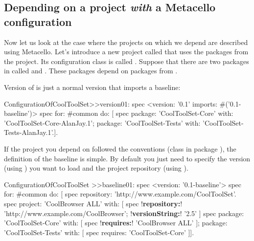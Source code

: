\documentclass[a4paper,10pt,twoside]{book}
\begin{document}
\subsection{Depending on a project \emph{with} a Metacello configuration}
Now let us look at the case where the projects on which we depend are described using Metacello.
Let's introduce a new project called  that uses the packages from the  project.  Its configuration class is called .   Suppose that there are two packages in  called  and . These packages depend on packages from . 

Version  of  is just a normal version that imports a baseline:
\begin{code}{}
ConfigurationOfCoolToolSet>>version01: spec 
       <version: '0.1' imports: #('0.1-baseline')>
       spec for: #common do: [
              spec 
                     package: 'CoolToolSet-Core' with: 'CoolToolSet-Core-AlanJay.1';
                     package: 'CoolToolSet-Tests' with: 'CoolToolSet-Tests-AlanJay.1'.].       
\end{code}       

\noindent
If the project you depend on followed the  conventions (\ie class  in package ), the definition of the baseline is simple. By default you just need to specify the version (using ) you want to load and the project repository (using ).

\begin{code}{}
ConfigurationOfCoolToolSet >>baseline01: spec 
       <version: '0.1-baseline'>
       spec for: #common do: [
              spec repository: 'http://www.example.com/CoolToolSet'.
              spec project: 'CoolBrowser ALL' with: [
                            spec 
                                 !\textbf{repository:}! 'http://www.example.com/CoolBrowser';
                                 !\textbf{versionString:}! '2.5' ]
              spec 
                     package: 'CoolToolSet-Core' with: [ spec !\textbf{requires:}! 'CoolBrowser ALL' ];
                     package: 'CoolToolSet-Tests' with: [ spec requires: 'CoolToolSet-Core' ]].
\end{code}
\end{document}

